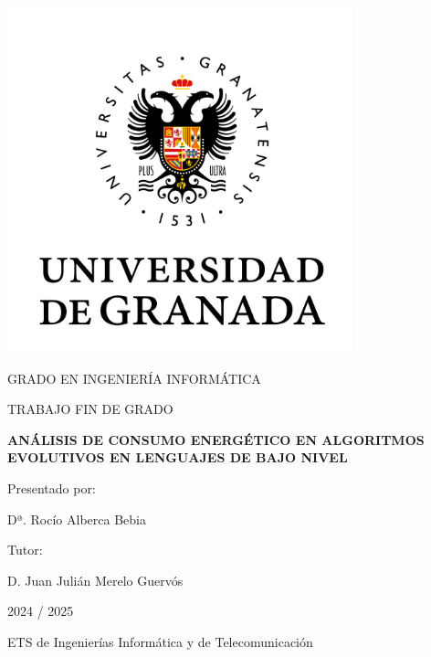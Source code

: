 \renewcommand{\baselinestretch}{1.5} 

\begingroup
\setlength{\parindent}{15pt} %
\setlength{\parskip}{0pt plus 1pt} %

\begin{titlepage}

\begin{center}

\includegraphics[width=10cm]{logo-ugr.png}

\vspace{8mm}


{\fontsize{14pt}{16pt} \selectfont GRADO EN INGENIERÍA INFORMÁTICA}

\vspace{8mm}


{\fontsize{14pt}{16pt} \selectfont TRABAJO FIN DE GRADO}

\vspace{15mm}

{\Large \textbf{ANÁLISIS DE CONSUMO ENERGÉTICO EN ALGORITMOS EVOLUTIVOS EN LENGUAJES DE BAJO NIVEL}} 

\vspace{20mm}

{\textmd{Presentado por:}} 

{\textmd{Dª. Rocío Alberca Bebia}}

\vspace{2mm}

{\textmd{Tutor:}} 

{\textmd{D. Juan Julián Merelo Guervós}}

\vspace{15mm}

{\textmd{\textnormal{2024 / 2025}}}

\vspace{5mm}

{\textmd{ETS de Ingenierías Informática y de Telecomunicación}}
\end{center}

\end{titlepage}

\endgroup